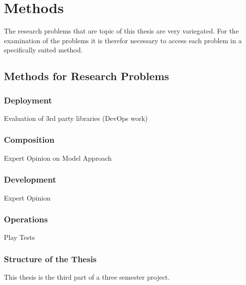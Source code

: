 \chapter{Methods}

The research problems that are topic of this thesis are very variegated. For the
examination of the problems it is therefor necessary to access each problem in a
specifically suited method. 

\section{Methods for Research Problems}

\subsection{Deployment}
Evaluation of 3rd party libraries (DevOps work)

\subsection{Composition}
Expert Opinion on Model Approach

\subsection{Development}
Expert Opinion

\subsection{Operations}
Play Tests




\subsection{Structure of the Thesis}

This thesis is the third part of a three semester project.

